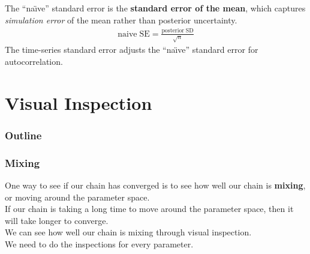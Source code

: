 \documentclass[handout]{beamer}
\begin{document}
\begin{frame}
The ``na\"{\i}ve'' standard error is the \textbf{standard error of the mean},
which captures \textit{simulation error} of the mean rather than posterior
uncertainty.  
\pause
\begin{eqnarray*}
\mathrm{naive \; SE} = \frac{\mathrm{posterior \; SD}}{\sqrt{n}}
\end{eqnarray*}
\pause
The time-series standard error adjusts the ``na\"{\i}ve'' standard
error for autocorrelation.
\end{frame}


\section{Visual Inspection}

\begin{frame}
\frametitle{Outline}
\tableofcontents[currentsection]
\end{frame}

\begin{frame}
\frametitle{Mixing}
\pause
One way to see if our chain has converged is to see how well our chain
is \textbf{mixing}, or moving around the parameter space.\\
\pause
\bigskip
If our chain is taking a long time to move around the parameter space,
then it will take longer to converge.  \\
\pause
\bigskip
We can see how well our chain is mixing through visual inspection. \\
\pause
\bigskip
We need to do the inspections for every parameter.
\end{frame}
\end{document}
